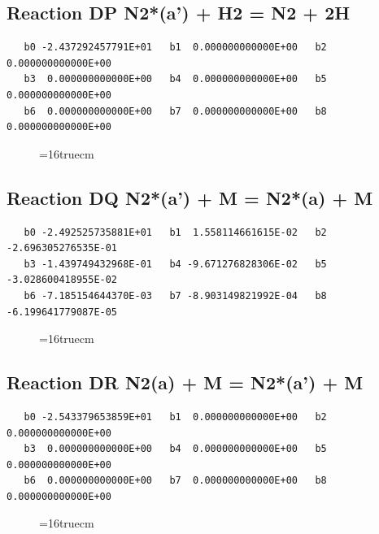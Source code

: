 \documentclass[12pt,dvipdfm]{article}
\begin{document}
\subsection{
Reaction DP N2*(a') + H2 = N2 + 2H }
\begin{small}\begin{verbatim}
   b0 -2.437292457791E+01   b1  0.000000000000E+00   b2  0.000000000000E+00
   b3  0.000000000000E+00   b4  0.000000000000E+00   b5  0.000000000000E+00
   b6  0.000000000000E+00   b7  0.000000000000E+00   b8  0.000000000000E+00
\end{verbatim}\end{small}
\begin{figure}[h!] \label{n2rates}
\epsfxsize=16truecm
\end{figure}
\newpage

\subsection{
Reaction DQ N2*(a') + M = N2*(a) + M }
\begin{small}\begin{verbatim}
   b0 -2.492525735881E+01   b1  1.558114661615E-02   b2 -2.696305276535E-01
   b3 -1.439749432968E-01   b4 -9.671276828306E-02   b5 -3.028600418955E-02
   b6 -7.185154644370E-03   b7 -8.903149821992E-04   b8 -6.199641779087E-05
\end{verbatim}\end{small}
\begin{figure}[h!] \label{n2rates}
\epsfxsize=16truecm
\end{figure}
\newpage

\subsection{
Reaction DR N2(a) + M = N2*(a') + M }
\begin{small}\begin{verbatim}
   b0 -2.543379653859E+01   b1  0.000000000000E+00   b2  0.000000000000E+00
   b3  0.000000000000E+00   b4  0.000000000000E+00   b5  0.000000000000E+00
   b6  0.000000000000E+00   b7  0.000000000000E+00   b8  0.000000000000E+00
\end{verbatim}\end{small}
\begin{figure}[h!] \label{n2rates}
\epsfxsize=16truecm
\end{figure}
\newpage
\end{document}
